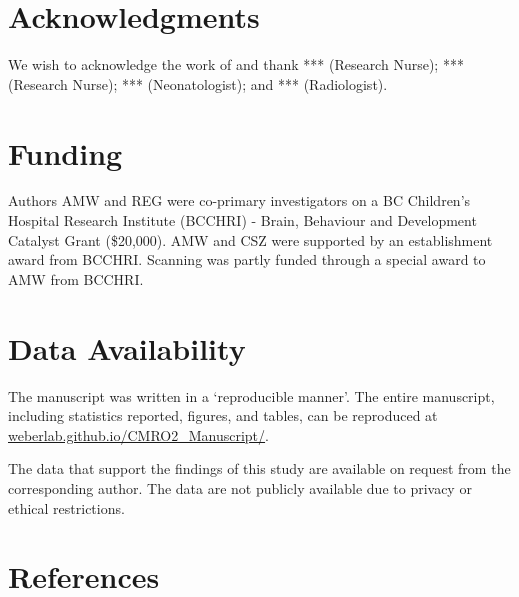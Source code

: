 \documentclass[
  letterpaper,
  DIV=11,
  numbers=noendperiod]{scrartcl}
\begin{document}
\section{Acknowledgments}\label{acknowledgments}

We wish to acknowledge the work of and thank *** (Research Nurse); ***
(Research Nurse); *** (Neonatologist); and *** (Radiologist).

\section{Funding}\label{funding}

Authors AMW and REG were co-primary investigators on a BC Children's
Hospital Research Institute (BCCHRI) - Brain, Behaviour and Development
Catalyst Grant (\$20,000). AMW and CSZ were supported by an
establishment award from BCCHRI. Scanning was partly funded through a
special award to AMW from BCCHRI.

\section{Data Availability}\label{data-availability}

The manuscript was written in a `reproducible manner'. The entire
manuscript, including statistics reported, figures, and tables, can be
reproduced at
\href{https://weberlab.github.io/CMRO2_Manuscript/}{weberlab.github.io/CMRO2\_Manuscript/}.

The data that support the findings of this study are available on
request from the corresponding author. The data are not publicly
available due to privacy or ethical restrictions.

\section{References}\label{references}
\end{document}
